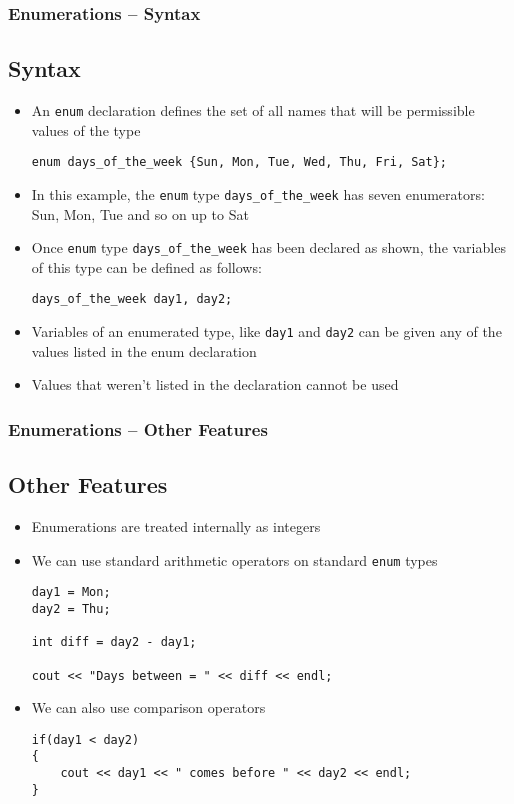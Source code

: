 \documentclass{beamer}
\begin{document}
\begin{frame}[fragile]
    \frametitle{Enumerations -- Syntax}
    \subsection{Syntax} %
    \label{sub:syntax}
    \begin{itemize}
        \item An \texttt{enum} declaration defines the set of all names that will be permissible values of the type
        \lstset{style=mystyle}
\begin{lstlisting}
enum days_of_the_week {Sun, Mon, Tue, Wed, Thu, Fri, Sat};
\end{lstlisting}
        \item In this example, the \texttt{enum} type \texttt{days\_of\_the\_week} has seven enumerators: Sun, Mon, Tue and so on up to Sat
        \item Once \texttt{enum} type \texttt{days\_of\_the\_week} has been declared as shown, the variables of this type can be defined as follows:
        \lstset{style=mystyle}
\begin{lstlisting}
days_of_the_week day1, day2;
\end{lstlisting}
        \item Variables of an enumerated type, like \texttt{day1} and \texttt{day2} can be given any of the values listed in the enum declaration
        \item Values that weren't listed in the declaration cannot be used
    \end{itemize}
\end{frame}

\begin{frame}[fragile]
    \frametitle{Enumerations -- Other Features}
    \subsection{Other Features} %
    \label{sub:other_features}
    \begin{itemize}
        \item Enumerations are treated internally as integers
        \item We can use standard arithmetic operators on standard \texttt{enum} types
        \lstset{style=mystyle}
\begin{lstlisting}
day1 = Mon;
day2 = Thu;

int diff = day2 - day1;

cout << "Days between = " << diff << endl;
\end{lstlisting}
        \item We can also use comparison operators
        \lstset{style=mystyle}
\begin{lstlisting}
if(day1 < day2)
{
    cout << day1 << " comes before " << day2 << endl;
}
\end{lstlisting}
    \end{itemize}
\end{frame}
\end{document}
